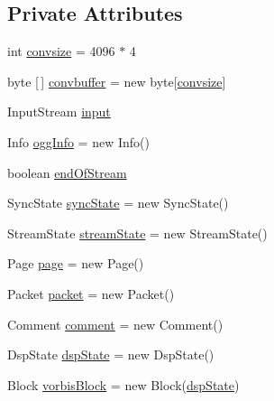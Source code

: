 \subsection*{Private Attributes}
\begin{DoxyCompactItemize}
\item 
int \mbox{\hyperlink{classorg_1_1newdawn_1_1slick_1_1openal_1_1_ogg_input_stream_a4164d082fa5f390c0297501481e4db36}{convsize}} = 4096 $\ast$ 4
\item 
byte \mbox{[}$\,$\mbox{]} \mbox{\hyperlink{classorg_1_1newdawn_1_1slick_1_1openal_1_1_ogg_input_stream_adca91d83f775a9ab56a25689e35272ed}{convbuffer}} = new byte\mbox{[}\mbox{\hyperlink{classorg_1_1newdawn_1_1slick_1_1openal_1_1_ogg_input_stream_a4164d082fa5f390c0297501481e4db36}{convsize}}\mbox{]}
\item 
Input\+Stream \mbox{\hyperlink{classorg_1_1newdawn_1_1slick_1_1openal_1_1_ogg_input_stream_ab6f4422dccd66dff43b69cf84f9bb791}{input}}
\item 
Info \mbox{\hyperlink{classorg_1_1newdawn_1_1slick_1_1openal_1_1_ogg_input_stream_a21aa37c5c0611a79132c4d76fbefe460}{ogg\+Info}} = new Info()
\item 
boolean \mbox{\hyperlink{classorg_1_1newdawn_1_1slick_1_1openal_1_1_ogg_input_stream_ac4c417186feeb02c3cd3ecfedee09831}{end\+Of\+Stream}}
\item 
Sync\+State \mbox{\hyperlink{classorg_1_1newdawn_1_1slick_1_1openal_1_1_ogg_input_stream_a6cf0c439e1258dd57e8e83b52b76aefd}{sync\+State}} = new Sync\+State()
\item 
Stream\+State \mbox{\hyperlink{classorg_1_1newdawn_1_1slick_1_1openal_1_1_ogg_input_stream_ac4bb8d3c4bd796cf4f20b21fdad304c0}{stream\+State}} = new Stream\+State()
\item 
Page \mbox{\hyperlink{classorg_1_1newdawn_1_1slick_1_1openal_1_1_ogg_input_stream_a1550384d82ddda332e721b907beb3c66}{page}} = new Page()
\item 
Packet \mbox{\hyperlink{classorg_1_1newdawn_1_1slick_1_1openal_1_1_ogg_input_stream_a926c6e76df40d3920cf3801c39bd7c89}{packet}} = new Packet()
\item 
Comment \mbox{\hyperlink{classorg_1_1newdawn_1_1slick_1_1openal_1_1_ogg_input_stream_adfe8fbcf485ce4dc911b8737cab63bb3}{comment}} = new Comment()
\item 
Dsp\+State \mbox{\hyperlink{classorg_1_1newdawn_1_1slick_1_1openal_1_1_ogg_input_stream_aaa29998e4b4c69e6fba08f5ea5764d15}{dsp\+State}} = new Dsp\+State()
\item 
Block \mbox{\hyperlink{classorg_1_1newdawn_1_1slick_1_1openal_1_1_ogg_input_stream_a1099572c535a994f564ec5ac35b656d9}{vorbis\+Block}} = new Block(\mbox{\hyperlink{classorg_1_1newdawn_1_1slick_1_1openal_1_1_ogg_input_stream_aaa29998e4b4c69e6fba08f5ea5764d15}{dsp\+State}})

\end{DoxyCompactItemize}
